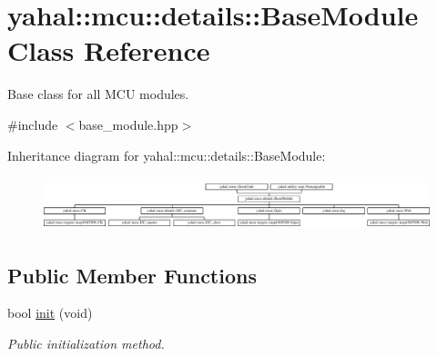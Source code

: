 \hypertarget{classyahal_1_1mcu_1_1details_1_1_base_module}{}\section{yahal\+:\+:mcu\+:\+:details\+:\+:Base\+Module Class Reference}
\label{classyahal_1_1mcu_1_1details_1_1_base_module}


Base class for all M\+C\+U modules.  




{\ttfamily \#include $<$base\+\_\+module.\+hpp$>$}

Inheritance diagram for yahal\+:\+:mcu\+:\+:details\+:\+:Base\+Module\+:\begin{figure}[H]
\begin{center}
\leavevmode
\includegraphics[height=1.575246cm]{classyahal_1_1mcu_1_1details_1_1_base_module}
\end{center}
\end{figure}
\subsection*{Public Member Functions}
\begin{DoxyCompactItemize}
\item 
bool \hyperlink{classyahal_1_1mcu_1_1details_1_1_base_module_a2389e2ad5dd20fb4cd7076dfe2f403ec}{init} (void)
\begin{DoxyCompactList}\small\item\em Public initialization method. \end{DoxyCompactList}\end{DoxyCompactItemize}
